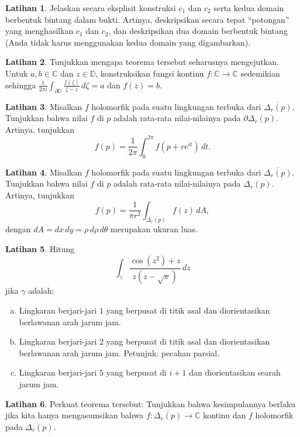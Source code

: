 \documentclass[12pt,openany]{book}
\newcommand{\C}{{\mathbb{C}}}
\newcommand{\D}{{\mathbb{D}}}
\newcommand{\myquote}[1]{``#1''}
\theoremstyle{plain}
\theoremstyle{remark}
\theoremstyle{definition}
\newenvironment{exbox}{%
    \def\FrameCommand{\vrule width 1pt \relax\hspace{10pt}}%
    \MakeFramed{\advance\hsize-\width\FrameRestore}%
}{%
    \endMakeFramed
}
\newenvironment{exparts}{%
    \leavevmode\begin{enumerate}[a),noitemsep,topsep=0pt,parsep=0pt,partopsep=0pt]
}{%
    \end{enumerate}
}
\theoremstyle{exercise}
\newtheorem{exercise}{Latihan}[section]
\theoremstyle{example}
\begin{document}
\begin{exbox}
\begin{exercise}
Jelaskan secara eksplisit konstruksi $c_1$ dan $c_2$ serta kedua domain berbentuk bintang
dalam bukti.  Artinya, deskripsikan secara tepat \myquote{potongan} yang menghasilkan
$c_1$ dan $c_2$, dan deskripsikan dua domain berbentuk bintang (Anda tidak harus menggunakan
kedua domain yang digambarkan).
\end{exercise}

\begin{exercise}
Tunjukkan mengapa teorema tersebut seharusnya mengejutkan.  Untuk $a,b \in \C$ dan $z \in \D$,
konstruksikan fungsi kontinu 
$f \colon \C \to \C$ sedemikian sehingga $\frac{1}{2\pi i}\int_{\partial \D}
\frac{f(\zeta)}{\zeta -z} \, d\zeta = a$ dan $f(z) = b$.
\end{exercise}

\begin{exercise}
Misalkan $f$ holomorfik pada suatu lingkungan terbuka dari $\overline{\Delta_r(p)}$.
Tunjukkan bahwa nilai $f$ di $p$ adalah rata-rata nilai-nilainya pada $\partial \Delta_r(p)$.
Artinya, tunjukkan
\begin{equation*}
f(p) = \frac{1}{2\pi} \int_0^{2\pi} f(p + r e^{it}) \, dt .
\end{equation*}
\end{exercise}

\begin{exercise}
Misalkan $f$ holomorfik pada suatu lingkungan terbuka dari $\overline{\Delta_r(p)}$.
Tunjukkan bahwa nilai $f$ di $p$ adalah rata-rata nilai-nilainya pada $\Delta_r(p)$.
Artinya, tunjukkan
\begin{equation*}
f(p) = \frac{1}{\pi r^2} \int_{\Delta_r(p)} f(z) \, dA ,
\end{equation*}
%
dengan $dA = dx \, dy = \rho \, d\rho \, d\theta$ merupakan ukuran luas.
\end{exercise}

\begin{exercise}
Hitung 
\begin{equation*}
\int_\gamma \frac{\cos ( z^2 ) +z}{z(z-\sqrt{\pi})} \, dz
\end{equation*}
jika $\gamma$ adalah:
\begin{exparts}
\item
Lingkaran berjari-jari $1$ yang berpusat di titik asal dan diorientasikan
berlawanan arah jarum jam.
\item
Lingkaran berjari-jari $2$ yang berpusat di titik asal dan diorientasikan
berlawanan arah jarum jam.  Petunjuk: pecahan parsial.
\item
Lingkaran berjari-jari $5$ yang berpusat di $i+1$ dan diorientasikan searah jarum jam.
\end{exparts}
\end{exercise}

\begin{exercise} \label{exercise:strongerCIFdisc}
Perkuat teorema tersebut: Tunjukkan bahwa kesimpulannya berlaku jika
kita hanya mengasumsikan bahwa $f \colon \overline{\Delta_r(p)} \to \C$
kontinu dan $f$ holomorfik pada $\Delta_r(p)$.
\end{exercise}
\end{exbox}
\end{document}
